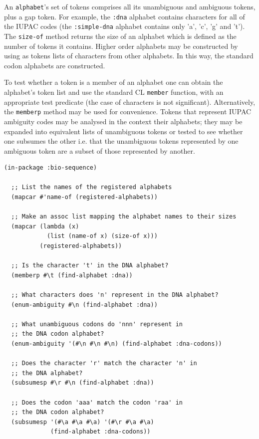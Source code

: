 \documentclass[a4paper, 12pt]{article}
\begin{document}
An \lstinline!alphabet!'s set of tokens comprises all its unambiguous
and ambiguous tokens, plus a gap token. For example, the
\lstinline!:dna! alphabet contains characters for all of the IUPAC
codes (the \lstinline!:simple-dna! alphabet contains only 'a', 'c',
'g' and 't'). The \lstinline!size-of! method returns the size of an
alphabet which is defined as the number of tokens it contains. Higher
order alphabets may be constructed by using as tokens lists of
characters from other alphabets. In this way, the standard codon
alphabets are constructed.

To test whether a token is a member of an alphabet one can obtain the
alphabet's token list and use the standard CL \lstinline!member!
function, with an appropriate test predicate (the case of characters
is not significant). Alternatively, the \lstinline!memberp! method may
be used for convenience. Tokens that represent IUPAC ambiguity codes
may be analysed in the context their alphabets; they may be expanded
into equivalent lists of unambiguous tokens or tested to see whether
one subsumes the other i.e. that the unambiguous tokens represented by
one ambiguous token are a subset of those represented by another.

\begin{lstlisting}[caption={Using bio-sequence alphabets},
  label=lst:using-bioseq-alphabets]
  (in-package :bio-sequence)
  
  ;; List the names of the registered alphabets
  (mapcar #'name-of (registered-alphabets))

  ;; Make an assoc list mapping the alphabet names to their sizes
  (mapcar (lambda (x)
            (list (name-of x) (size-of x)))
          (registered-alphabets))

  ;; Is the character 't' in the DNA alphabet?
  (memberp #\t (find-alphabet :dna))

  ;; What characters does 'n' represent in the DNA alphabet?
  (enum-ambiguity #\n (find-alphabet :dna))

  ;; What unambiguous codons do 'nnn' represent in
  ;; the DNA codon alphabet?
  (enum-ambiguity '(#\n #\n #\n) (find-alphabet :dna-codons))

  ;; Does the character 'r' match the character 'n' in
  ;; the DNA alphabet?
  (subsumesp #\r #\n (find-alphabet :dna))

  ;; Does the codon 'aaa' match the codon 'raa' in
  ;; the DNA codon alphabet?
  (subsumesp '(#\a #\a #\a) '(#\r #\a #\a)
             (find-alphabet :dna-codons))
\end{lstlisting}
\end{document}
